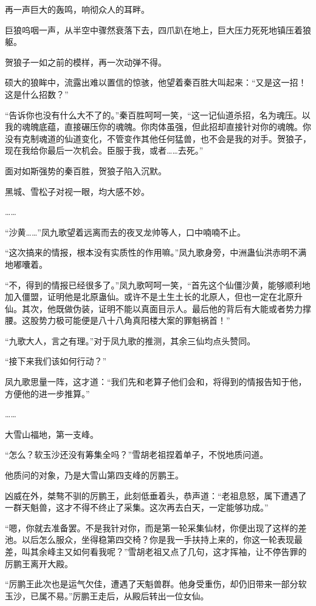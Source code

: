 \begin{this_body}
再一声巨大的轰鸣，响彻众人的耳畔。

巨狼呜咽一声，从半空中骤然衰落下去，四爪趴在地上，巨大压力死死地镇压着狼躯。

贺狼子一如之前的模样，再一次动弹不得。

硕大的狼眸中，流露出难以置信的惊骇，他望着秦百胜大叫起来：“又是这一招！这是什么招数？”

“告诉你也没有什么大不了的。”秦百胜呵呵一笑，“这一记仙道杀招，名为魂压。以我的魂魄底蕴，直接碾压你的魂魄。你肉体虽强，但此招却直接针对你的魂魄。你没有克制魂道的仙道变化，不管变作其他任何猛兽，也不会是我的对手。贺狼子，现在我给你最后一次机会。臣服于我，或者……去死。”

面对如斯强势的秦百胜，贺狼子陷入沉默。

黑城、雪松子对视一眼，均大感不妙。

……

“沙黄……”凤九歌望着远离而去的夜叉龙帅等人，口中喃喃不止。

“这次搞来的情报，根本没有实质性的作用嘛。”凤九歌身旁，中洲蛊仙洪赤明不满地嘟囔着。

“不，得到的情报已经很多了。”凤九歌呵呵一笑，“首先这个仙僵沙黄，能够顺利地加入僵盟，证明他是北原蛊仙。或许不是土生土长的北原人，但也一定在北原升仙。其次，他既做伪装，证明不能以真面目示人。最后他的背后有大能或者势力撑腰。这股势力极可能便是八十八角真阳楼大案的罪魁祸首！”

“九歌大人，言之有理。”对于凤九歌的推测，其余三仙均点头赞同。

“接下来我们该如何行动？”

凤九歌思量一阵，这才道：“我们先和老算子他们会和，将得到的情报告知于他，方便他的进一步推算。”

……

大雪山福地，第一支峰。

“怎么？软玉沙还没有筹集全吗？”雪胡老祖捏着单子，不悦地质问道。

他质问的对象，乃是大雪山第四支峰的厉鹏王。

凶威在外，桀骜不驯的厉鹏王，此刻低垂着头，恭声道：“老祖息怒，属下遭遇了一群天魁兽，这才不得不终止了采集。这次再去白天，一定能够功成。”

“嗯，你就去准备罢。不是我针对你，而是第一轮采集仙材，你便出现了这样的差池。以后怎么服众，坐得稳第四交椅？你是我一手扶持上来的，你这一轮表现最差，叫其余峰主又如何看我呢？”雪胡老祖又点了几句，这才挥袖，让不停告罪的厉鹏王离开大殿。

“厉鹏王此次也是运气欠佳，遭遇了天魁兽群。他身受重伤，却仍旧带来一部分软玉沙，已属不易。”厉鹏王走后，从殿后转出一位女仙。


\end{this_body}
